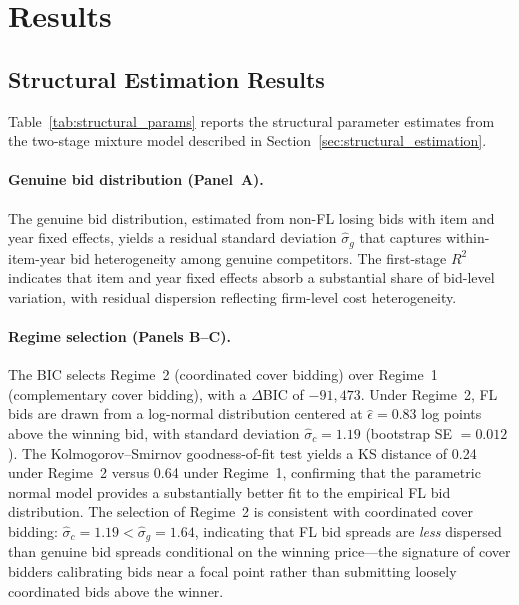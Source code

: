 
\section{Results}
\label{sec:results}


\subsection{Structural Estimation Results} %
\label{sec:results_structural}

Table~\ref{tab:structural_params} reports the structural parameter
estimates from the two-stage mixture model described in
Section~\ref{sec:structural_estimation}.

\paragraph{Genuine bid distribution (Panel~A).}
The genuine bid distribution, estimated from non-FL losing bids with
item and year fixed effects, yields a residual standard deviation
$\hat{\sigma}_g$ that captures within-item-year bid heterogeneity
among genuine competitors. The first-stage $R^2$ indicates that item
and year fixed effects absorb a substantial share of bid-level
variation, with residual dispersion reflecting firm-level cost
heterogeneity.

\paragraph{Regime selection (Panels B--C).} %
The BIC selects Regime~2 (coordinated cover bidding) over Regime~1
(complementary cover bidding), with a $\Delta$BIC of $-91{,}473$.
Under Regime~2, FL bids are drawn from a log-normal distribution
centered at $\hat{\epsilon} = 0.83$ log points above the winning bid,
with standard deviation $\hat{\sigma}_c = 1.19$ (bootstrap
SE $= 0.012$). The Kolmogorov--Smirnov goodness-of-fit test yields a
KS distance of 0.24 under Regime~2 versus 0.64 under Regime~1,
confirming that the parametric normal model provides a substantially
better fit to the empirical FL bid distribution.
The selection of Regime~2 is consistent with coordinated cover bidding:
$\hat{\sigma}_c = 1.19 < \hat{\sigma}_g = 1.64$, indicating that
FL bid spreads are \emph{less} dispersed than genuine bid spreads
conditional on the winning price---the signature of cover bidders
calibrating bids near a focal point rather than submitting loosely
coordinated bids above the winner.

